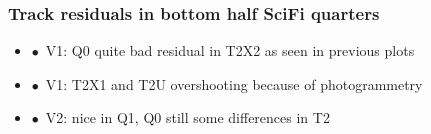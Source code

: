 \documentclass[aspectratio=1610, 12pt]{beamer}
\begin{document}
\begin{frame}\frametitle{Track residuals in bottom half SciFi quarters}
  \begin{itemize}
    \item $\bullet$\, V1: Q0 quite bad residual in T2X2 as seen in previous plots
    \item $\bullet$\, V1: T2X1 and T2U overshooting because of photogrammetry
    \item $\bullet$\, V2: nice in Q1, Q0 still some differences in T2
  \end{itemize}
  \begin{figure}
  \end{figure}
\end{frame}
\end{document}
